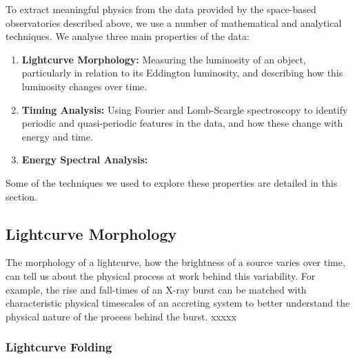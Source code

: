 \par To extract meaningful physics from the data provided by the space-based observatories described above, we use a number of mathematical and analytical techniques.  We analyse three main properties of the data:
\begin{enumerate}
\item \textbf{Lightcurve Morphology:} Measuring the luminosity of an object, particularly in relation to its Eddington luminosity, and describing how this luminosity changes over time.
\item \textbf{Timing Analysis:} Using Fourier and Lomb-Scargle spectroscopy to identify periodic and quasi-periodic features in the data, and how these change with energy and time.
\item \textbf{Energy Spectral Analysis:}
\end{enumerate}
\par Some of the techniques we used to explore these properties are detailed in this section.

\subsection{Lightcurve Morphology}

\par The morphology of a lightcurve, how the brightness of a source varies over time, can tell us about the physical process at work behind this variability.  For example, the rise and fall-times of an X-ray burst can be matched with characteristic physical timescales of an accreting system to better understand the physical nature of the process behind the burst. xxxxx

\subsubsection{Lightcurve Folding}

